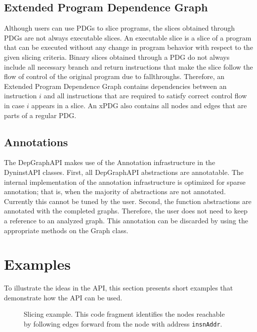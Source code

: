 \documentclass[12pt,titlepage]{article}
\begin{document}
\subsection{Extended Program Dependence Graph}
Although users can use PDGs to slice programs, the slices obtained through PDGs
are not always executable slices. An executable slice is a slice of a program that
can be executed without any change in program behavior with respect to the
given slicing criteria. Binary slices obtained through a PDG do not always
include all necessary branch and return instructions that make the slice follow
the flow of control of the original program due to fallthroughs. Therefore, an
Extended Program Dependence Graph contains dependencies between an instruction
$i$ and all instructions that are required to satisfy correct control flow
in case $i$ appears in a slice. An xPDG also contains all nodes and edges
that are parts of a regular PDG.

\subsection{Annotations} 

The DepGraphAPI makes use of the Annotation infrastructure in the
DyninstAPI classes. First, all DepGraphAPI abstractions are
annotatable. The internal implementation of the annotation
infrastructure is optimized for sparse annotation; that is, when the
majority of abstractions are not annotated. Currently this cannot be
tuned by the user. Second, the function abstractions are annotated
with the completed graphs. Therefore, the user does not need to keep a
reference to an analyzed graph. This annotation can be discarded by
using the appropriate methods on the Graph class.

\section{Examples} 

To illustrate the ideas in the API, this section presents
short examples that demonstrate how the API can be used.  

\begin{figure}

\caption{Slicing example. This code fragment identifies the nodes
  reachable by following edges forward from the node with address
  \texttt{insnAddr}.}
\label{example1}
\end{figure}
\end{document}
